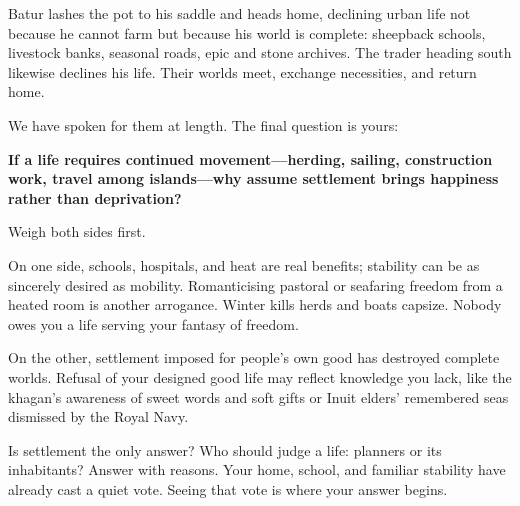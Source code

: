 Batur lashes the pot to his saddle and heads home, declining urban life not because he cannot farm but because his world is complete: sheepback schools, livestock banks, seasonal roads, epic and stone archives. The trader heading south likewise declines his life. Their worlds meet, exchange necessities, and return home.

We have spoken for them at length. The final question is yours:

\textbf{If a life requires continued movement---herding, sailing, construction work, travel among islands---why assume settlement brings happiness rather than deprivation?}

Weigh both sides first.

On one side, schools, hospitals, and heat are real benefits; stability can be as sincerely desired as mobility. Romanticising pastoral or seafaring freedom from a heated room is another arrogance. Winter kills herds and boats capsize. Nobody owes you a life serving your fantasy of freedom.

On the other, settlement imposed for people's own good has destroyed complete worlds. Refusal of your designed good life may reflect knowledge you lack, like the khagan's awareness of sweet words and soft gifts or Inuit elders' remembered seas dismissed by the Royal Navy.

Is settlement the only answer? Who should judge a life: planners or its inhabitants? Answer with reasons. Your home, school, and familiar stability have already cast a quiet vote. Seeing that vote is where your answer begins.
